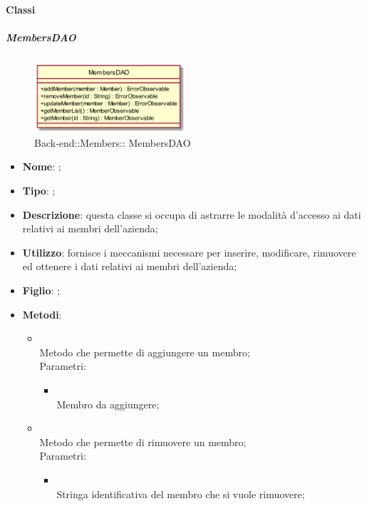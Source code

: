 \paragraph{Classi}
\hypertarget{ MembersDAO_label}{\subparagraph{ MembersDAO}}
\begin{figure}[h]
	\centering
	\includegraphics[width=0.50\textwidth,height=\textheight,keepaspectratio]{images/ClassMembersDAO.png}
	\caption{Back-end::Members:: MembersDAO}
\end{figure}
\begin{itemize}
	\item \textbf{Nome}: ;
	\item \textbf{Tipo}: ;
	\item \textbf{Descrizione}: questa classe si occupa di astrarre le modalità d'accesso ai dati relativi ai membri dell'azienda;
	\item \textbf{Utilizzo}: fornisce i meccanismi necessare per inserire, modificare, rimuovere ed ottenere i dati relativi ai membri dell'azienda;
	\item \textbf{Figlio}: ;
	\item \textbf{Metodi}:
	\begin{itemize}
		\item[]  \\		Metodo che permette di aggiungere un membro;\\
		Parametri:
		\begin{itemize}
			\item {} \\
			Membro da aggiungere;
		\end{itemize}
		\item[]  \\		Metodo che permette di rimuovere un membro;\\
		Parametri:
		\begin{itemize}
			\item {} \\
			Stringa identificativa del membro che si vuole rimuovere;

\end{itemize}
\end{itemize}
\end{itemize}
